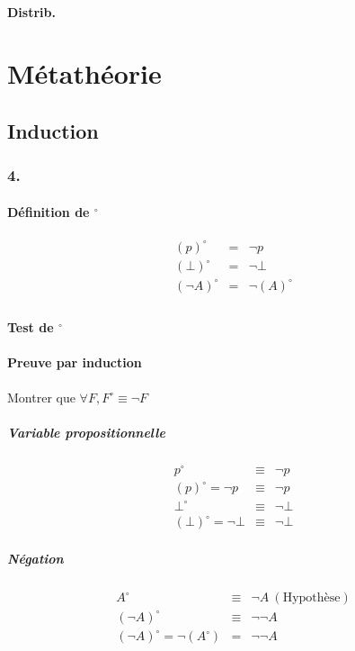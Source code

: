\documentclass[12pt,a4paper,openany]{report}
\newcommand{\dual}{^\circ}
\begin{document}
	\subsubsection{Distrib.}

%
%
%
%
	\chapter{Métathéorie}
	\section{Induction}
	\subsection{4.}
		\subsubsection{Définition de $^\circ$}
		\begin{eqnarray*}
			(p)^\circ &=& \neg p\\
			(\bot)^\circ &=& \neg \bot\\
			(\neg A)^\circ &=& \neg(A)^\circ\\
		\end{eqnarray*}
		\subsubsection{Test de $^\circ$}
		\subsubsection{Preuve par induction}
		Montrer que $\forall F, F^\circ \equiv \neg F$\\
		\paragraph{Variable propositionnelle}
		\begin{eqnarray*}
			p\dual &\equiv& \neg p\\
			(p)\dual = \neg p &\equiv& \neg p\\
			\bot \dual &\equiv& \neg \bot\\
			(\bot)\dual = \neg \bot &\equiv& \neg \bot
		\end{eqnarray*}

		\paragraph{Négation}
		\begin{eqnarray*}
			A\dual &\equiv&\neg A\ (\textrm{Hypothèse})\\
			(\neg A)\dual &\equiv& \neg \neg A\\
			(\neg A)\dual = \neg(A\dual) &=& \neg \neg A\\
		\end{eqnarray*}
\end{document}
